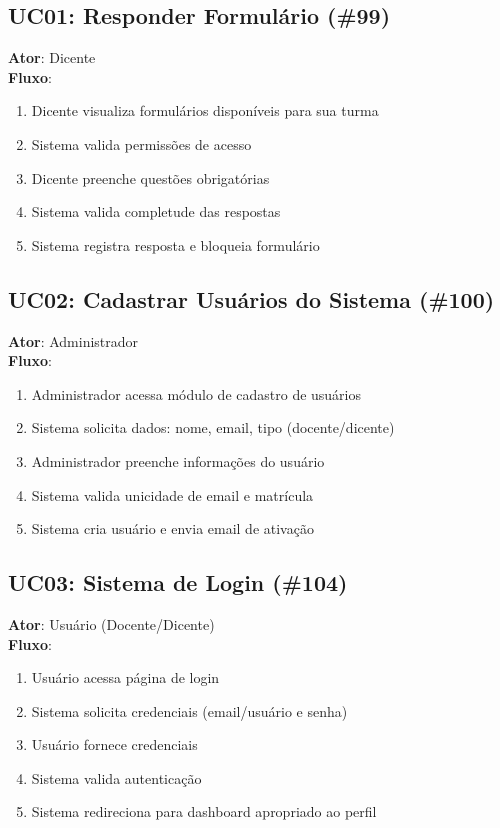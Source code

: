 \documentclass[a4paper,12pt]{article}
\begin{document}
\subsection{UC01: Responder Formulário (\#99)}
\textbf{Ator}: Dicente\\
\textbf{Fluxo}:
\begin{enumerate}
    \item Dicente visualiza formulários disponíveis para sua turma
    \item Sistema valida permissões de acesso
    \item Dicente preenche questões obrigatórias
    \item Sistema valida completude das respostas
    \item Sistema registra resposta e bloqueia formulário
\end{enumerate}

\subsection{UC02: Cadastrar Usuários do Sistema (\#100)}
\textbf{Ator}: Administrador\\
\textbf{Fluxo}:
\begin{enumerate}
    \item Administrador acessa módulo de cadastro de usuários
    \item Sistema solicita dados: nome, email, tipo (docente/dicente)
    \item Administrador preenche informações do usuário
    \item Sistema valida unicidade de email e matrícula
    \item Sistema cria usuário e envia email de ativação
\end{enumerate}

\subsection{UC03: Sistema de Login (\#104)}
\textbf{Ator}: Usuário (Docente/Dicente)\\
\textbf{Fluxo}:
\begin{enumerate}
    \item Usuário acessa página de login
    \item Sistema solicita credenciais (email/usuário e senha)
    \item Usuário fornece credenciais
    \item Sistema valida autenticação
    \item Sistema redireciona para dashboard apropriado ao perfil
\end{enumerate}
\end{document}
